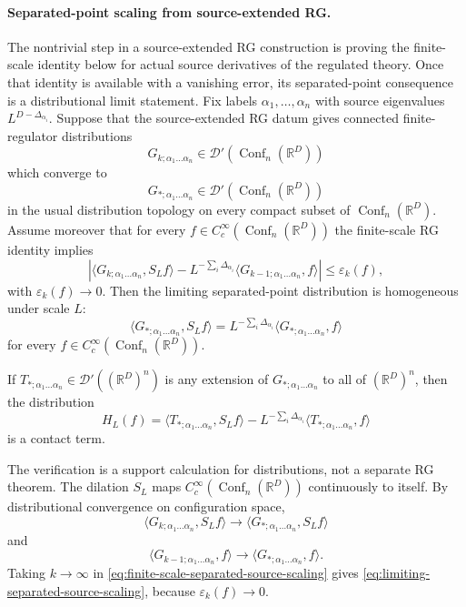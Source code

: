 \paragraph{Separated-point scaling from source-extended RG.}
The nontrivial step in a source-extended RG construction is proving the
finite-scale identity below for actual source derivatives of the regulated
theory.  Once that identity is available with a vanishing error, its
separated-point consequence is a distributional limit statement.  Fix labels
\(\alpha_1,\ldots,\alpha_n\) with source eigenvalues
\(L^{D-\Delta_{\alpha_i}}\).  Suppose that the source-extended RG datum gives
connected finite-regulator distributions
\[
  G_{k;\alpha_1\ldots\alpha_n}
  \in
  \mathcal D'(\operatorname{Conf}_n(\mathbb R^D))
  \]
which converge to
\[
  G_{\ast;\alpha_1\ldots\alpha_n}
  \in
  \mathcal D'(\operatorname{Conf}_n(\mathbb R^D))
  \]
in the usual distribution topology on every compact subset of
\(\operatorname{Conf}_n(\mathbb R^D)\).  Assume moreover that for every
\(f\in C_c^\infty(\operatorname{Conf}_n(\mathbb R^D))\) the finite-scale RG
identity implies
\begin{equation}
  \left|
  \langle G_{k;\alpha_1\ldots\alpha_n},S_Lf\rangle
  -
  L^{-\sum_i\Delta_{\alpha_i}}
  \langle G_{k-1;\alpha_1\ldots\alpha_n},f\rangle
  \right|
  \leq \varepsilon_k(f),
  \label{eq:finite-scale-separated-source-scaling}
\end{equation}
with \(\varepsilon_k(f)\to0\).  Then the limiting separated-point
distribution is homogeneous under scale \(L\):
\begin{equation}
  \langle G_{\ast;\alpha_1\ldots\alpha_n},S_Lf\rangle
  =
  L^{-\sum_i\Delta_{\alpha_i}}
  \langle G_{\ast;\alpha_1\ldots\alpha_n},f\rangle
  \label{eq:limiting-separated-source-scaling}
\end{equation}
for every \(f\in C_c^\infty(\operatorname{Conf}_n(\mathbb R^D))\).

If \(T_{\ast;\alpha_1\ldots\alpha_n}\in
\mathcal D'((\mathbb R^D)^n)\) is any extension of
\(G_{\ast;\alpha_1\ldots\alpha_n}\) to all of \((\mathbb R^D)^n\), then the
distribution
\begin{equation}
  H_L(f)
  =
  \langle T_{\ast;\alpha_1\ldots\alpha_n},S_Lf\rangle
  -
  L^{-\sum_i\Delta_{\alpha_i}}
  \langle T_{\ast;\alpha_1\ldots\alpha_n},f\rangle
  \label{eq:scaling-violation-contact-distribution}
\end{equation}
is a contact term.

The verification is a support calculation for distributions, not a separate
RG theorem.
The dilation \(S_L\) maps
\(C_c^\infty(\operatorname{Conf}_n(\mathbb R^D))\) continuously to itself.
By distributional convergence on configuration space,
\[
  \langle G_{k;\alpha_1\ldots\alpha_n},S_Lf\rangle
  \longrightarrow
  \langle G_{\ast;\alpha_1\ldots\alpha_n},S_Lf\rangle
\]
and
\[
  \langle G_{k-1;\alpha_1\ldots\alpha_n},f\rangle
  \longrightarrow
  \langle G_{\ast;\alpha_1\ldots\alpha_n},f\rangle .
\]
Taking \(k\to\infty\) in
\eqref{eq:finite-scale-separated-source-scaling} gives
\eqref{eq:limiting-separated-source-scaling}, because
\(\varepsilon_k(f)\to0\).

